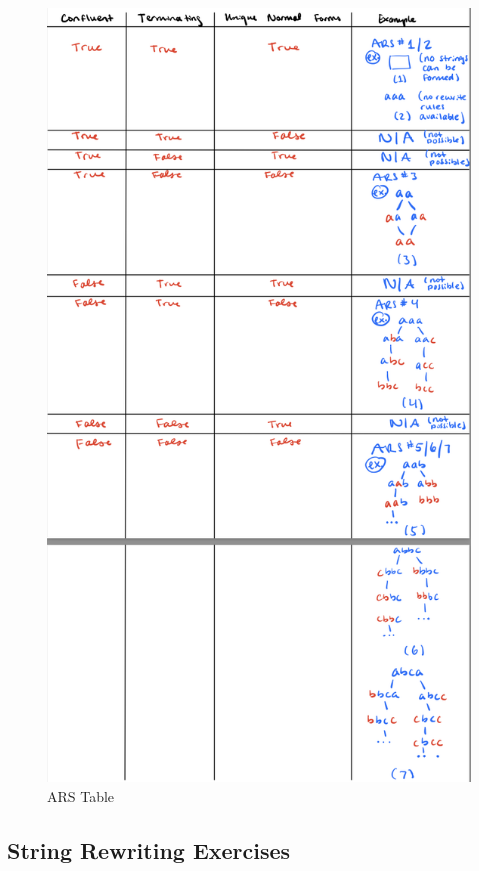 \documentclass{article}
\theoremstyle{theorem}
\theoremstyle{definition}
\theoremstyle{remark}
\begin{document}
\begin{figure}[H]
\begin{center}
\includegraphics[scale=0.9]{img/ARSTable.png}
\end{center}
\caption{ARS Table}\label{WS}
\end{figure}

\subsection{String Rewriting Exercises}
\end{document}
